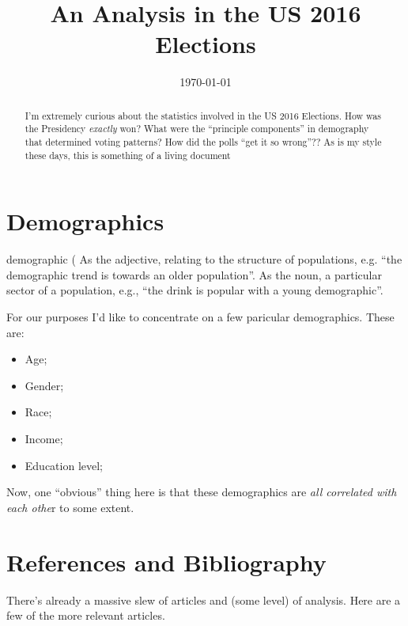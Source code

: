 \documentclass[11pt]{article}
\begin{document}
\title{An Analysis in the US 2016 Elections}
\date{\today}
\maketitle


\begin{abstract}
I'm extremely curious about the statistics involved in the US 2016
Elections.  How was the Presidency {\it exactly} won? What were the
``principle components'' in demography that determined voting
patterns? How did the polls ``get it so wrong''??
As is my style these days, this is something of a living document 
\end{abstract}

\tableofcontents


\newpage
\section{Demographics}
demographic (
As the adjective, relating to the structure of populations, e.g. ``the demographic trend is towards an older population''. As the noun, a particular sector of a population, e.g., 
``the drink is popular with a young demographic''. 

For our purposes I'd like to concentrate on a few paricular demographics. These are:
\begin{itemize}
    \item{Age;}
    \item{Gender;}
    \item{Race;}
    \item{Income;}
    \item{Education level;}
\end{itemize}
Now, one ``obvious'' thing here is that these demographics are {\it all correlated with each othe}r to some extent. 

















\section{References and Bibliography}
There's already a massive slew of articles and (some level) of analysis. Here are a few of the more relevant articles.
\end{document}
